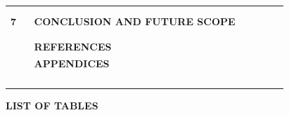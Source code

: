 \documentclass[12pt,letterpaper,oneside]{report}
\newcommand{\fronttitle}[1]{\begin{center}{\bfseries\fontsize{16}{22}\selectfont #1}\end{center}\vspace{10pt}}
\begin{document}
{\begin{longtable}{@{}p{0.08\linewidth}p{0.76\linewidth}>{\raggedleft\arraybackslash}p{0.1\linewidth}@{}}
 & \hspace{1.2em}{\small Discussion} & {\small\pageref{sec:6.4}} \\
 & \hspace{1.2em}{\small Limitations} & {\small\pageref{sec:6.5}} \\
\textbf{7} & \textbf{CONCLUSION AND FUTURE SCOPE} & \textbf{\pageref{ch:7}} \\
 & \hspace{1.2em}{\small Conclusion} & {\small\pageref{sec:7.1}} \\
 & \hspace{1.2em}{\small Future Scope} & {\small\pageref{sec:7.2}} \\
\textbf{} & \textbf{REFERENCES} & \textbf{\pageref{refs}} \\
\textbf{} & \textbf{APPENDICES} & \textbf{\pageref{appx}} \\
 & \hspace{1.2em}{\small Appendix 1: Message Formats} & {\small\pageref{sec:appendix-1-message-formats}} \\
 & \hspace{1.2em}{\small Appendix 2: Bill of Materials} & {\small\pageref{sec:appendix-2-bill-of-materials}} \\
 & \hspace{1.2em}{\small Paper Publication Proof} & {\small\pageref{sec:paper-publication-proof}} \\
 & \hspace{1.2em}{\small Plagiarism Report} & {\small\pageref{sec:plagiarism-report}} \\
\end{longtable}}
\clearpage
\fronttitle{LIST OF TABLES}\label{lot}
\end{document}
